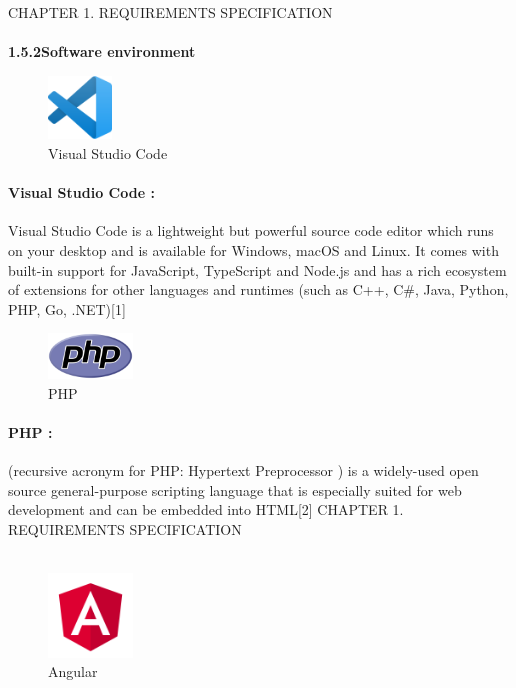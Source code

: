 \documentclass{article}
\begin{document}
\newpage
\noindent
CHAPTER 1.  REQUIREMENTS SPECIFICATION \\
\underline{\hspace{\textwidth}} \vspace{0.2cm}\\
{\large \textbf{1.5.2\hspace{1em}Software environment}}\vspace{0.2cm}
\begin{figure}[htbp]
    \centering
    \includegraphics[width=0.15\textwidth]{ddd}
    \caption{Visual Studio Code}
    \label{fig:design1}
\end{figure}

\paragraph{Visual Studio Code :} 
Visual Studio Code is a lightweight but powerful source code editor which runs on your desktop and is available for Windows, macOS and Linux. It comes with built-in support for JavaScript, TypeScript and Node.js and has a rich ecosystem of extensions for other languages and runtimes (such as C++, C\#, Java, Python, PHP, Go, .NET)[1]

\vspace{1cm}

\begin{figure}[htbp]
    \centering
    \includegraphics[width=0.2\textwidth]{eee}
    \caption{PHP}
    \label{fig:design2}
\end{figure}

\paragraph{PHP :} 
(recursive acronym for PHP: Hypertext Preprocessor ) is a widely-used open source general-purpose scripting language that is especially suited for web development and can be embedded into HTML[2]
\vspace{1cm}
\newpage
\noindent
CHAPTER 1.  REQUIREMENTS SPECIFICATION \\
\underline{\hspace{\textwidth}} \vspace{0.2cm}\\
\begin{figure}[htbp]
    \centering
    \includegraphics[width=0.2\textwidth]{ccc}
    \caption{Angular}
    \label{fig:design3}
\end{figure}
\end{document}
